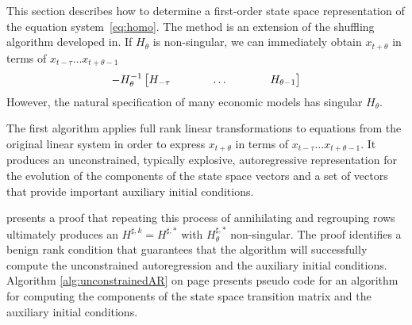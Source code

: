 \documentclass[12pt]{article}
\begin{document}
This section describes how to determine a first-order state space
representation of the equation system~\ref{eq:homo}. The method is an extension
of the shuffling algorithm developed in\cite{luenberger78,luenberger77}.
If $H_\theta$ is non-singular, we can immediately obtain $x_{t+\theta}$ 
in terms of $x_{t-\tau} \ldots x_{t+\theta-1}$
\begin{gather}
-  H_{\theta}^{-1}\begin{bmatrix}
    H_{-\tau}&\hspace{0.25in}&\dots&\hspace{0.25in}&H_{\theta-1}
  \end{bmatrix}  
\end{gather}
However, the natural specification of many economic models has singular
 $H_\theta$.

The first  algorithm
applies full rank linear transformations 
to equations from the original linear system in order to express
$x_{t+\theta}$ in terms of $x_{t-\tau} \ldots x_{t+\theta-1}$.
It produces an unconstrained, typically explosive, 
autoregressive representation for the evolution of the components of
the state space vectors and a set of vectors 
that provide important auxiliary initial conditions. 






\label{sec:gfrr}

% 
% 
% 

\cite{anderson10} presents a proof that repeating 
this process of annihilating and regrouping rows ultimately  produces 
an $H^{\sharp,k}=H^{\sharp,\ast}$ with $H^{\sharp,\ast}_\theta$ non-singular.
The proof identifies a benign rank condition 
that guarantees that the algorithm will successfully compute
the unconstrained autoregression and the auxiliary initial conditions.
Algorithm \ref{alg:unconstrainedAR} on page \pageref{alg:unconstrainedAR} presents pseudo code for 
an algorithm for computing the 
components of the state space transition matrix and the auxiliary initial
conditions.
\end{document}
